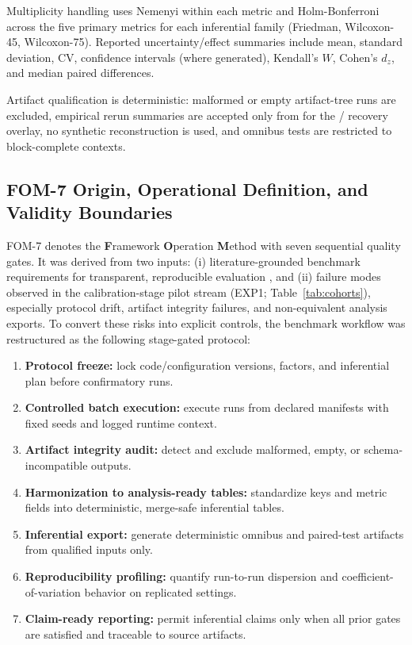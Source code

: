 \documentclass[twoside,11pt]{article}
\begin{document}
Multiplicity handling uses Nemenyi within each metric and Holm-Bonferroni
across the five primary metrics for each inferential family (Friedman,
Wilcoxon-45, Wilcoxon-75). Reported uncertainty/effect summaries include
mean, standard deviation, CV, confidence intervals (where generated),
Kendall's $W$, Cohen's $d_z$, and median paired differences.

Artifact qualification is deterministic: malformed or empty artifact-tree runs
are excluded, empirical rerun summaries are accepted only from
 for the /
recovery overlay, no synthetic reconstruction is used, and omnibus tests are
restricted to block-complete contexts.

\subsection{FOM-7 Origin, Operational Definition, and Validity Boundaries}
\label{sec:methods-repro}
FOM-7 denotes the \textbf{F}ramework \textbf{O}peration \textbf{M}ethod with
seven sequential quality gates. It was derived from two inputs: (i)
literature-grounded benchmark requirements for transparent, reproducible
evaluation \citep{canha2025functionally,agarwal2022openxai,hedstrom2023quantus},
and (ii) failure modes observed in the calibration-stage pilot stream
(EXP1; Table~\ref{tab:cohorts}), especially protocol drift, artifact integrity
failures, and non-equivalent analysis exports. To convert these risks into
explicit controls, the benchmark workflow was restructured as the following
stage-gated protocol:
\begin{enumerate}[leftmargin=*]
    \item \textbf{Protocol freeze:} lock code/configuration versions, factors,
    and inferential plan before confirmatory runs.
    \item \textbf{Controlled batch execution:} execute runs from declared
    manifests with fixed seeds and logged runtime context.
    \item \textbf{Artifact integrity audit:} detect and exclude malformed,
    empty, or schema-incompatible outputs.
    \item \textbf{Harmonization to analysis-ready tables:} standardize keys and
    metric fields into deterministic, merge-safe inferential tables.
    \item \textbf{Inferential export:} generate deterministic omnibus and
    paired-test artifacts from qualified inputs only.
    \item \textbf{Reproducibility profiling:} quantify run-to-run dispersion and
    coefficient-of-variation behavior on replicated settings.
    \item \textbf{Claim-ready reporting:} permit inferential claims only when
    all prior gates are satisfied and traceable to source artifacts.
\end{enumerate}
\end{document}
